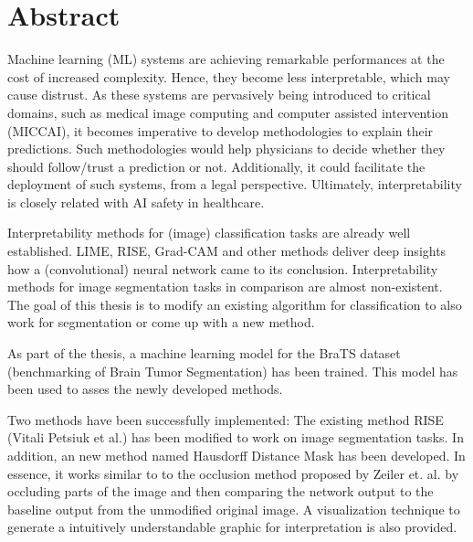 \chapter*{Abstract}
\label{chap:managementSummary}

Machine learning (ML) systems are achieving remarkable performances at the cost of increased complexity. Hence, they become less interpretable, which may cause distrust. As these systems are pervasively being introduced to critical domains, such as medical image computing and computer assisted intervention (MICCAI), it becomes imperative to develop methodologies to explain their predictions. Such methodologies would help physicians to decide whether they should follow/trust a prediction or not. Additionally, it could facilitate the deployment of such systems, from a legal perspective. Ultimately, interpretability is closely related with AI safety in healthcare.

Interpretability methods for (image) classification tasks are already well established. LIME, RISE, Grad-CAM and other methods deliver deep insights how a (convolutional) neural network came to its conclusion. Interpretability methods for image segmentation tasks in comparison are almost non-existent. The goal of this thesis is to modify an existing algorithm for classification to also work for segmentation or come up with a new method.

As part of the thesis, a machine learning model for the BraTS dataset (benchmarking of Brain Tumor Segmentation) has been trained. This model has been used to asses the newly developed methods.

Two methods have been successfully implemented: The existing method RISE (Vitali Petsiuk et al.) has been modified to work on image segmentation tasks. In addition, an new method named Hausdorff Distance Mask has been developed. In essence, it works similar to to the occlusion method proposed by Zeiler et. al. by occluding parts of the image and then comparing the network output to the baseline output from the unmodified original image. A visualization technique to generate a intuitively understandable graphic for interpretation is also provided.